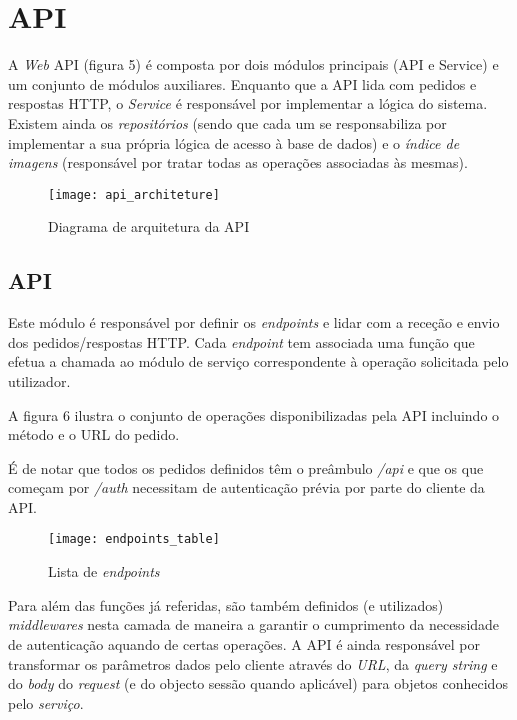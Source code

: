 \section{API}

A \textit{Web} API (figura 5) é composta por dois módulos principais (API e Service) e um conjunto de módulos auxiliares. Enquanto que a API lida com pedidos e respostas HTTP, o \textit{Service} é responsável por implementar a lógica do sistema. Existem ainda os \textit{repositórios} (sendo que cada um se responsabiliza por implementar a sua própria lógica de acesso à base de dados) e o \textit{índice de imagens} (responsável por tratar todas as operações associadas às mesmas).~\cite{nodejs_the_right_way}\par \medskip

\begin{figure}[h]
	\centering
	\texttt{[image: api\_architeture]}
	\caption{Diagrama de arquitetura da API}
\end{figure}

\subsection{API}
Este módulo é responsável por definir os \textit{endpoints} e lidar com a receção e envio dos pedidos/respostas HTTP. Cada \textit{endpoint} tem associada uma função que efetua a chamada ao módulo de serviço correspondente à operação solicitada pelo utilizador. \par \medskip

A figura 6 ilustra o conjunto de operações disponibilizadas pela API incluindo o método e o URL do pedido.	 \par \medskip

É de notar que todos os pedidos definidos têm o preâmbulo \textit{/api} e que os que começam por \textit{/auth} necessitam de autenticação prévia por parte do cliente da API. \par \medskip

\newpage

\begin{figure}[h]
	\centering
	\texttt{[image: endpoints\_table]}
	\caption{Lista de \textit{endpoints}}
\end{figure}

Para além das funções já referidas, são também definidos (e utilizados) \textit{middlewares} nesta camada de maneira a garantir o cumprimento da necessidade de autenticação aquando de certas operações. A API é ainda responsável por transformar os parâmetros dados pelo cliente através do \textit{URL}, da \textit{query string} e do \textit{body} do \textit{request} (e do objecto sessão quando aplicável) para objetos conhecidos pelo \textit{serviço}. \medskip


